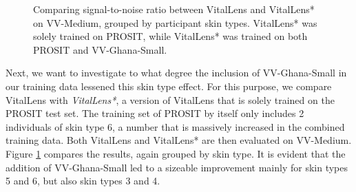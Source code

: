 \documentclass{article}
\begin{document}
\begin{figure}[h!]
  \centering
  \caption{Comparing signal-to-noise ratio between VitalLens and VitalLens* on VV-Medium, grouped by participant skin types. VitalLens* was solely trained on PROSIT, while VitalLens* was trained on both PROSIT and VV-Ghana-Small.}
  \label{fig:impact-skin-type-comparison}
\end{figure}

Next, we want to investigate to what degree the inclusion of VV-Ghana-Small in our training data lessened this skin type effect.
For this purpose, we compare VitalLens with \textit{VitalLens*}, a version of VitalLens that is solely trained on the PROSIT test set.
The training set of PROSIT by itself only includes 2 individuals of skin type 6, a number that is massively increased in the combined training data.
Both VitalLens and VitalLens* are then evaluated on VV-Medium.
Figure \ref{fig:impact-skin-type-comparison} compares the results, again grouped by skin type.
It is evident that the addition of VV-Ghana-Small led to a sizeable improvement mainly for skin types 5 and 6, but also skin types 3 and 4.
\end{document}
